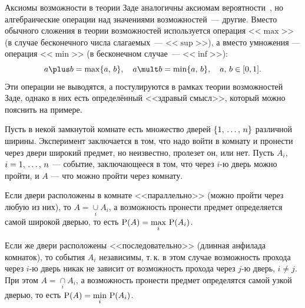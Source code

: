 Аксиомы возможности в теории Заде аналогичны аксиомам вероятности~\cite{kolmogorov}, но алгебраические операции над значениями возможностей~--- другие. Вместо обычного сложения в теории возможностей используется операция <<$\max$>> (в случае бесконечного числа слагаемых~--- <<$\sup$>>), а вместо умножения --- операция <<$\min$>> (в бесконечном случае~--- <<$\inf$>>):
\begin{equation}
\label{operations_zadeh}
    a \plus b = \max\{a,\, b\}, \quad a \mult b = \min\{a,\, b\}, \quad a,\,b \in [0,1].
\end{equation}
Эти операции не выводятся, а постулируются в рамках теории возможностей Заде, однако в них есть определённый <<здравый смысл>>, который можно пояснить на примере. 
\begin{example}
\label{example_zadeh}
Пусть в некой замкнутой комнате есть множество дверей $\setN$ различной ширины. Эксперимент заключается в том, что надо войти в комнату и пронести через двери широкий предмет, но неизвестно, пролезет он, или нет. Пусть $A_i$, $i = \dotN$ --- событие, заключающееся в том, что через $i$-ю дверь можно пройти, и $A$ --- что можно пройти через комнату.   

Если двери расположены в комнате <<параллельно>> (можно пройти через любую из них), то $A = \underset{i} \cup A_i$, а возможность пронести предмет определяется самой широкой дверью, то есть $\displaystyle \P(A) = \max_i\,\P(A_i)$. 

Если же двери расположены <<последовательно>> (длинная анфилада комнаток), то события $A_i$ независимы, т.\,к. в этом случае возможность прохода через $i$-ю дверь никак не зависит от возможность прохода через $j$-ю дверь, $i \neq j$. При этом $A = \underset{i} \cap A_i$, а возможность пронести предмет определятся самой узкой дверью, то есть $\displaystyle \P(A) = \min_i\,\P(A_i)$.
\end{example}

